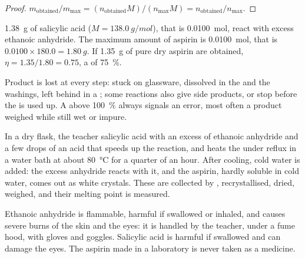 \begin{proof}
$m_{\text{obtained}} / m_{\max} = (n_{\text{obtained}} M) / (n_{\max} M)
= n_{\text{obtained}} / n_{\max}$.
\end{proof}

\begin{example}\label{ex:g10:synthesis-yield:small}
\qty{1.38}{g} of salicylic acid ($M = \qty{138.0}{g/mol}$), that is
\qty{0.0100}{mol}, react with excess ethanoic anhydride. The maximum
amount of aspirin is \qty{0.0100}{mol}, that is
$0.0100 \times 180.0 = \qty{1.80}{g}$. If \qty{1.35}{g} of pure dry
aspirin are obtained, $\eta = 1.35 / 1.80 = 0.75$, a  of
\qty{75}{\percent}.
\end{example}

\begin{remark}\label{rem:g10:synthesis-yield:below}
Product is lost at every step: stuck on glassware, dissolved in the
 and the washings, left behind in a ; some
reactions also give side products, or stop before the 
is used up. A  above \qty{100}{\percent} always signals an error,
most often a product weighed while still wet or impure.
\end{remark}

\begin{inthelab}
In a dry flask, the teacher  salicylic acid with an excess of
ethanoic anhydride and a few drops of an acid that speeds up the
reaction, and heats the  under reflux in a water bath at about
\qty{80}{\celsius} for a quarter of an hour. After cooling, cold water
is added: the excess anhydride reacts with it, and the aspirin, hardly
soluble in cold water, comes out as white crystals. These are collected
by , recrystallised, dried, weighed, and their melting
point is measured.
\end{inthelab}

\begin{safety}{}
Ethanoic anhydride is flammable, harmful if swallowed or inhaled, and causes severe burns
of the skin and the eyes: it is handled by the teacher, under a fume
hood, with gloves and goggles. Salicylic acid is harmful if swallowed and
can damage the eyes. The aspirin made in a laboratory is never taken as
a medicine.
\end{safety}

